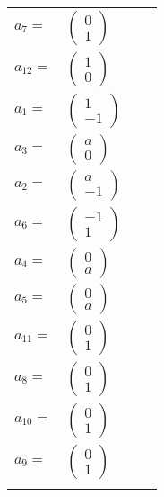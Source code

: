 \documentclass[1p]{elsarticle_modified}
\theoremstyle{definition}
\begin{document}
\begin{tabular}{m{7pt} m{180pt} m{7pt} m{180pt} }
\flushright $a_{7}=$&$\begin{pmatrix}0\\1\end{pmatrix}$ \\
\flushright $a_{12}=$&$\begin{pmatrix}1\\0\end{pmatrix}$ \\
\flushright $a_{1}=$&$\begin{pmatrix}1\\-1\end{pmatrix}$ \\
\flushright $a_{3}=$&$\begin{pmatrix}a\\0\end{pmatrix}$ \\
\flushright $a_{2}=$&$\begin{pmatrix}a\\-1\end{pmatrix}$ \\
\flushright $a_{6}=$&$\begin{pmatrix}-1\\1\end{pmatrix}$ \\
\flushright $a_{4}=$&$\begin{pmatrix}0\\a\end{pmatrix}$ \\
\flushright $a_{5}=$&$\begin{pmatrix}0\\a\end{pmatrix}$ \\
\flushright $a_{11}=$&$\begin{pmatrix}0\\1\end{pmatrix}$ \\
\flushright $a_{8}=$&$\begin{pmatrix}0\\1\end{pmatrix}$ \\
\flushright $a_{10}=$&$\begin{pmatrix}0\\1\end{pmatrix}$ \\
\flushright $a_{9}=$&$\begin{pmatrix}0\\1\end{pmatrix}$\\&\end{tabular}
\end{document}
